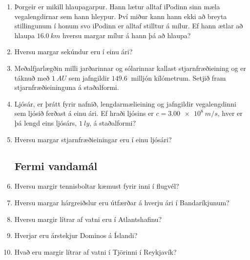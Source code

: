 \begin{enumerate}[label = \textbf{Dæmi \thechapter.\arabic*.}]
\item Þorgeir er mikill hlaupagarpur. Hann lætur alltaf iPodinn sinn mæla vegalengdirnar sem hann hleypur. Því miður kann hann ekki að breyta stillingunum í honum svo iPodinn er alltaf stilltur á mílur. Ef hann ætlar að hlaupa $\SI{16.0}{km}$ hversu margar mílur á hann þá að hlaupa?

\item Hversu margar sekúndur eru í einu ári?

\item Meðalfjarlægðin milli jarðarinnar og sólarinnar kallast stjarnfræðieining og er táknuð með $\SI{1}{AU}$ sem jafngildir $\SI{149.6}{}$ milljón kílómetrum. Setjið fram stjarnfræðieininguna á staðalformi.

\item Ljósár, er þrátt fyrir nafnið, lengdarmælieining og jafngildir vegalengdinni sem ljósið ferðast á einu ári. Ef hraði ljósins er $c = \SI{3.00e8}{m/s}$, hver er þá lengd eins ljósárs, $\SI{1}{ly}$, á staðalformi?

\item Hversu margar stjarnfræðieiningar eru í einu ljósári?

\subsection*{Fermi vandamál}

\item Hversu margir tennisboltar kæmust fyrir inni í flugvél?

\item Hversu margar hárgreiðslur eru útfærðar á hverju ári í Bandaríkjunum?

\item Hversu margir lítrar af vatni eru í Atlantshafinu?

\item Hverjar eru árstekjur Dominos á Íslandi?

\item Hvað eru margir lítrar af vatni í Tjörinni í Reykjavík?

\end{enumerate}
